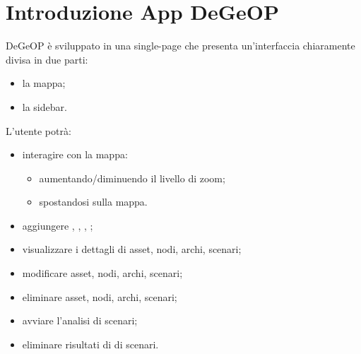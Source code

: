 \section{Introduzione App DeGeOP}
DeGeOP è sviluppato in una single-page che presenta un'interfaccia chiaramente divisa in due parti:
\begin{itemize}
	\item la mappa;
	\item la sidebar.
\end{itemize}
L'utente potrà:
\begin{itemize}
	\item interagire con la mappa:
	\begin{itemize}
		\item aumentando/diminuendo il livello di zoom;
		\item spostandosi sulla mappa.
	\end{itemize}
	\item aggiungere , , , ;
	\item visualizzare i dettagli di asset, nodi, archi, scenari;
	\item modificare asset, nodi, archi, scenari;
	\item eliminare asset, nodi, archi, scenari;
	\item avviare l'analisi di scenari;
	\item eliminare risultati di  di scenari.
\end{itemize}
